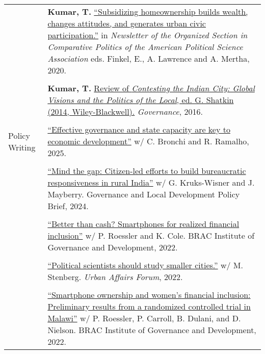 \documentclass[letterpaper, 10.5pt]{article}
\begin{document}
\begin{longtable}{p{1.5in}p{5in}}

& \textbf{Kumar, T.}
 \href{https://www.comparativepoliticsnewsletter.org/wp-content/uploads/2020/05/Spring-Newsletter-2020.pdf}{``Subsidizing homeownership builds wealth, changes attitudes, and generates urban civic participation.''} in \textit{Newsletter of the Organized Section in Comparative Politics of the American Political Science Association} eds. Finkel, E., A. Lawrence and A. Mertha, 2020. \\
&\\
& \textbf{Kumar, T.} \href{http://onlinelibrary.wiley.com/doi/10.1111/gove.12241/abstract}{Review of \textit{Contesting the Indian City: Global Visions and the Politics of the Local}, ed. G. Shatkin (2014, Wiley-Blackwell).} \textit{Governance}, 2016. 

\\

& \\


Policy Writing &

\href{https://blogs.worldbank.org/en/governance/effective-governance-and-state-capacity-are-key-to-economic-deve}{``Effective governance and state capacity are key to economic development''} w/ C. Bronchi and R. Ramalho, 2025.\\

& \\

&\href{https://gld.gu.se/media/tptdfltw/policy-brief-no26.pdf}{``Mind the gap: Citizen-led efforts to build bureaucratic
responsiveness in rural India''} w/ G. Kruks-Wisner and J. Mayberry. Governance and Local Development Policy Brief, 2024. \\

& \\

& \href{https://bigd.bracu.ac.bd/better-than-cash-smartphones-for-realized-financial-inclusion/}{``Better than cash? Smartphones for realized financial inclusion''} w/ P. Roessler and K. Cole. BRAC Institute of Governance and Development, 2022. \\
&\\

& \href{https://urbanaffairsreview.com/2022/10/11/why-political-scientists-should-study-smaller-cities/}{``Political scientists should study smaller cities.''} w/ M. Stenberg. \textit{Urban Affairs Forum}, 2022.\\
& \\
& \href{https://bigd.bracu.ac.bd/smartphone-ownership-and-pathways-to-womens-uptake-of-digital-financial-services-preliminary-results-from-a-randomized-controlled-trial-in-malawi/}{``Smartphone ownership and women’s financial inclusion: Preliminary results from a randomized controlled trial in Malawi''} w/ P. Roessler, P. Carroll, B. Dulani, and D. Nielson. BRAC Institute of Governance and Development, 2022.\\


\end{longtable}
\end{document}
